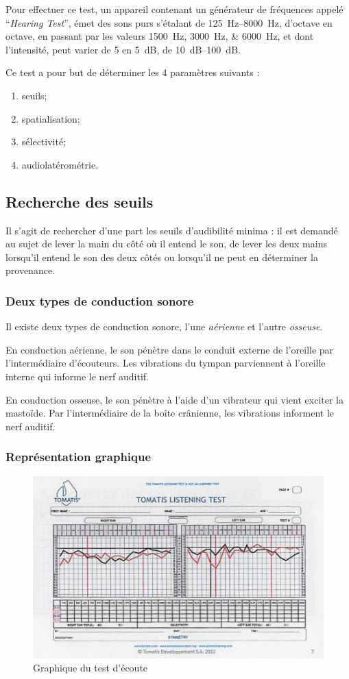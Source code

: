 {Pour effectuer ce test, un appareil contenant un générateur de fréquences appelé ``\emph{Hearing Test}'', émet des sons purs s'étalant de \SIrange{125}{8000}{\Hz}, d'octave en octave, en passant par les valeurs
\SIlist{1500;3000;6000}{\Hz}, et dont l'intensité, peut varier de 5 en \SI{5}{\dB}, de \SIrange{10}{100}{\dB}. 

Ce test a pour but de déterminer les 4 paramètres suivants : 
\begin{enumerate}
\item seuils;
\item spatialisation;
\item sélectivité;
\item audiolatérométrie.
\end{enumerate}

\subsection{Recherche des seuils}

Il s'agit de rechercher d'une part les seuils d'audibilité
minima : il est demandé au sujet de lever la main du côté
où il entend le son, de lever les deux mains lorsqu'il entend le son
des deux côtés ou lorsqu'il ne peut en déterminer la provenance.

\subsubsection{Deux types de conduction sonore}
Il existe deux types de conduction sonore, l'une \emph{aérienne} et l'autre \emph{osseuse}.

En conduction aérienne, le son pénètre dans le conduit externe de
l'oreille par l'intermédiaire d'écouteurs. Les vibrations du tympan
parviennent à l'oreille interne qui informe le nerf auditif.

En conduction osseuse, le son pénètre à l'aide d'un
vibrateur qui vient exciter la mastoïde. Par l'intermédiaire de la
boîte crânienne, les vibrations informent le nerf auditif.

\subsubsection{Représentation graphique}

\begin{figure}
	\centering
	\includegraphics[width=0.7\linewidth]{images/tomatisListeningTest}
	\caption[Graphique du test d'écoute]{Graphique du test d'écoute}
	\label{fig:tomatislisteningtest}
\end{figure}

}
